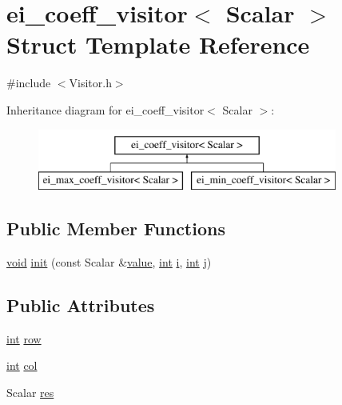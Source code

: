 \hypertarget{structei__coeff__visitor}{\section{ei\-\_\-coeff\-\_\-visitor$<$ Scalar $>$ Struct Template Reference}
\label{structei__coeff__visitor}
}


{\ttfamily \#include $<$Visitor.\-h$>$}

Inheritance diagram for ei\-\_\-coeff\-\_\-visitor$<$ Scalar $>$\-:\begin{figure}[H]
\begin{center}
\leavevmode
\includegraphics[height=2.000000cm]{structei__coeff__visitor}
\end{center}
\end{figure}
\subsection*{Public Member Functions}
\begin{DoxyCompactItemize}
\item 
\hyperlink{group___u_a_v_objects_plugin_ga444cf2ff3f0ecbe028adce838d373f5c}{void} \hyperlink{structei__coeff__visitor_a555dd950987ded6af7286805f4f32bbd}{init} (const Scalar \&\hyperlink{glext_8h_aa0e2e9cea7f208d28acda0480144beb0}{value}, \hyperlink{ioapi_8h_a787fa3cf048117ba7123753c1e74fcd6}{int} \hyperlink{uavobjecttemplate_8m_a6f6ccfcf58b31cb6412107d9d5281426}{i}, \hyperlink{ioapi_8h_a787fa3cf048117ba7123753c1e74fcd6}{int} j)
\end{DoxyCompactItemize}
\subsection*{Public Attributes}
\begin{DoxyCompactItemize}
\item 
\hyperlink{ioapi_8h_a787fa3cf048117ba7123753c1e74fcd6}{int} \hyperlink{structei__coeff__visitor_a841642cd3a1185073276dbb458a9031e}{row}
\item 
\hyperlink{ioapi_8h_a787fa3cf048117ba7123753c1e74fcd6}{int} \hyperlink{structei__coeff__visitor_aed0fd007a6b1c332201db4559aa616f3}{col}
\item 
Scalar \hyperlink{structei__coeff__visitor_a46146b8d6e43d1df63b5dfd196e13b9a}{res}
\end{DoxyCompactItemize}


